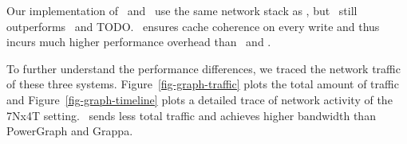 Our implementation of \dsmxact\ and \dsmnoxact\ use the same network stack as \hotpot,
but \hotpot\ still outperforms \dsmnoxact\ and TODO.
\dsmnoxact\ ensures cache coherence on every write and thus incurs much higher performance overhead than \hotpot\ and \dsmxact.

To further understand the performance differences, we traced the network traffic of these three systems.
Figure~\ref{fig-graph-traffic} plots the total amount of traffic %
and Figure~\ref{fig-graph-timeline} plots a detailed trace of network activity of the 7Nx4T setting.
\hotpot\ sends less total traffic and achieves higher bandwidth than PowerGraph and Grappa.
